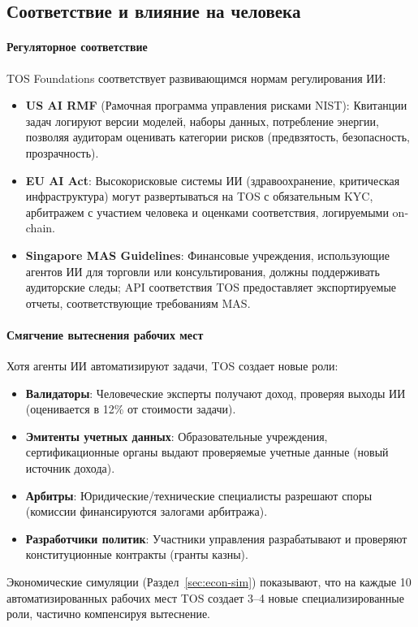 \documentclass[11pt]{article}
\begin{document}
\subsection{Соответствие и влияние на человека}
\paragraph{Регуляторное соответствие} TOS Foundations соответствует развивающимся нормам регулирования ИИ:
\begin{itemize}[noitemsep]
  \item \textbf{US AI RMF} (Рамочная программа управления рисками NIST): Квитанции задач логируют версии моделей, наборы данных, потребление энергии, позволяя аудиторам оценивать категории рисков (предвзятость, безопасность, прозрачность).
  \item \textbf{EU AI Act}: Высокорисковые системы ИИ (здравоохранение, критическая инфраструктура) могут развертываться на TOS с обязательным KYC, арбитражем с участием человека и оценками соответствия, логируемыми on-chain.
  \item \textbf{Singapore MAS Guidelines}: Финансовые учреждения, использующие агентов ИИ для торговли или консультирования, должны поддерживать аудиторские следы; API соответствия TOS предоставляет экспортируемые отчеты, соответствующие требованиям MAS.
\end{itemize}

\paragraph{Смягчение вытеснения рабочих мест} Хотя агенты ИИ автоматизируют задачи, TOS создает новые роли:
\begin{itemize}[noitemsep]
  \item \textbf{Валидаторы}: Человеческие эксперты получают доход, проверяя выходы ИИ (оценивается в 12\% от стоимости задачи).
  \item \textbf{Эмитенты учетных данных}: Образовательные учреждения, сертификационные органы выдают проверяемые учетные данные (новый источник дохода).
  \item \textbf{Арбитры}: Юридические/технические специалисты разрешают споры (комиссии финансируются залогами арбитража).
  \item \textbf{Разработчики политик}: Участники управления разрабатывают и проверяют конституционные контракты (гранты казны).
\end{itemize}
Экономические симуляции (Раздел~\ref{sec:econ-sim}) показывают, что на каждые 10 автоматизированных рабочих мест TOS создает 3--4 новые специализированные роли, частично компенсируя вытеснение.
\end{document}
